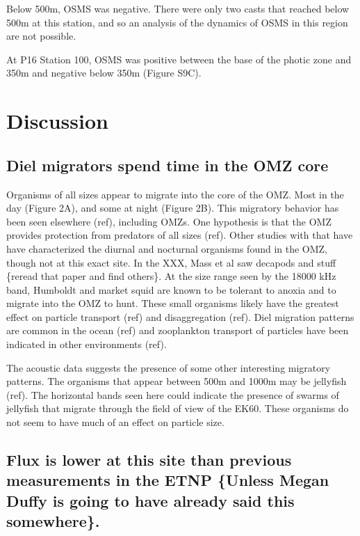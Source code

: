 \documentclass[]{article}
\begin{document}
Below 500m, OSMS was negative. There were only two casts that reached
below 500m at this station, and so an analysis of the dynamics of OSMS
in this region are not possible.

At P16 Station 100, OSMS was positive between the base of the photic
zone and 350m and negative below 350m (Figure S9C).

\hypertarget{discussion}{%
\section{Discussion}\label{discussion}}

\hypertarget{diel-migrators-spend-time-in-the-omz-core}{%
\subsection{Diel migrators spend time in the OMZ
core}\label{diel-migrators-spend-time-in-the-omz-core}}

Organisms of all sizes appear to migrate into the core of the OMZ. Most
in the day (Figure 2A), and some at night (Figure 2B). This migratory
behavior has been seen elsewhere (ref), including OMZs. One hypothesis
is that the OMZ provides protection from predators of all sizes (ref).
Other studies with that have have characterized the diurnal and
nocturnal organisms found in the OMZ, though not at this exact site. In
the XXX, Mass et al saw decapods and stuff \{reread that paper and find
others\}. At the size range seen by the 18000 kHz band, Humboldt and
market squid are known to be tolerant to anoxia and to migrate into the
OMZ to hunt. These small organisms likely have the greatest effect on
particle transport (ref) and disaggregation (ref). Diel migration
patterns are common in the ocean (ref) and zooplankton transport of
particles have been indicated in other environments (ref).

The acoustic data suggests the presence of some other interesting
migratory patterns. The organisms that appear between 500m and 1000m may
be jellyfish (ref). The horizontal bands seen here could indicate the
presence of swarms of jellyfish that migrate through the field of view
of the EK60. These organisms do not seem to have much of an effect on
particle size.

\hypertarget{flux-is-lower-at-this-site-than-previous-measurements-in-the-etnp-unless-megan-duffy-is-going-to-have-already-said-this-somewhere.}{%
\subsection{Flux is lower at this site than previous measurements in the
ETNP \{Unless Megan Duffy is going to have already said this
somewhere\}.}\label{flux-is-lower-at-this-site-than-previous-measurements-in-the-etnp-unless-megan-duffy-is-going-to-have-already-said-this-somewhere.}}
\end{document}
